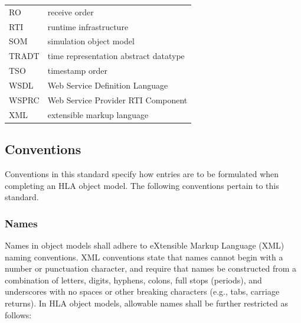 \begin{tabular}{@{}p{50pt}p{382pt}@{}}
    RO    & receive order                                \\
    RTI   & runtime infrastructure                       \\
    SOM   & simulation object model                      \\
    TRADT & time representation abstract datatype        \\
    TSO   & timestamp order                              \\
    WSDL  & Web Service Definition Language              \\
    WSPRC & Web Service Provider RTI Component           \\
    XML   & extensible markup language                   \\
\end{tabular}
\endgroup

\subsection{Conventions}
Conventions in this standard specify how entries are to be formulated when completing an HLA object model. The following conventions pertain to this standard.

\newpage

\subsubsection{Names}
Names in object models shall adhere to eXtensible Markup Language (XML) naming conventions. XML conventions state that names cannot begin with a number or punctuation character, and require that names be constructed from a combination of letters, digits, hyphens, colons, full stops (periods), and underscores with no spaces or other breaking characters (e.g., tabs, carriage returns). In HLA object models, allowable names shall be further restricted as follows:

